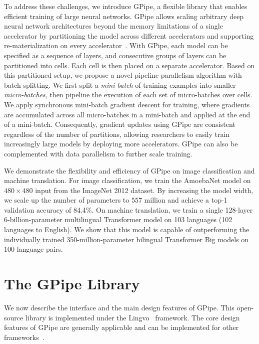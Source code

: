 \documentclass{article}
\def\codename{GPipe}
\begin{document}
To address these challenges, we introduce \codename{}, a flexible library that enables efficient training of large neural networks. \codename{} allows scaling arbitrary deep neural network architectures beyond the memory limitations of a single accelerator by partitioning the model across different accelerators and supporting re-materialization on every accelerator~\cite{griewank2000algorithm,chen2016training}.
With \codename{}, each model can be specified as a sequence of layers, and consecutive groups of layers can be partitioned into cells. Each cell is then placed on a separate accelerator. Based on this partitioned setup, we propose a novel pipeline parallelism algorithm with batch splitting. We first split a \textit{mini-batch} of training examples into smaller \textit{micro-batches}, then pipeline the execution of each set of micro-batches over cells. We apply synchronous mini-batch gradient descent for training, where gradients are accumulated across all micro-batches in a mini-batch and applied at the end of a mini-batch. Consequently, gradient updates using \codename{} are consistent regardless of the number of partitions, allowing researchers to easily train increasingly large models by deploying more accelerators. \codename{} can also be complemented with data parallelism to further scale training.

We demonstrate the flexibility and efficiency of \codename{} on image classification and machine translation. For image classification, we train the AmoebaNet model on $480\times480$ input from the ImageNet 2012 dataset. By increasing the model width, we scale up the number of parameters to $557$ million and achieve a top-1 validation accuracy of 84.4\%. On machine translation, we train a single 128-layer 6-billion-parameter multilingual Transformer model on 103 languages (102 languages to English). We show that this model is capable of outperforming the individually trained 350-million-parameter bilingual Transformer Big \cite{vaswani2017attention} models on 100 language pairs.

\section{The \codename{} Library}
We now describe the interface and the main design features of \codename{}. This open-source library is implemented  under the Lingvo~\cite{shen2019lingvo} framework. The core design features of \codename{} are generally applicable and can be implemented for other frameworks~\cite{jia2014caffe, chen2015mxnet,paszke2017automatic}.
\end{document}
